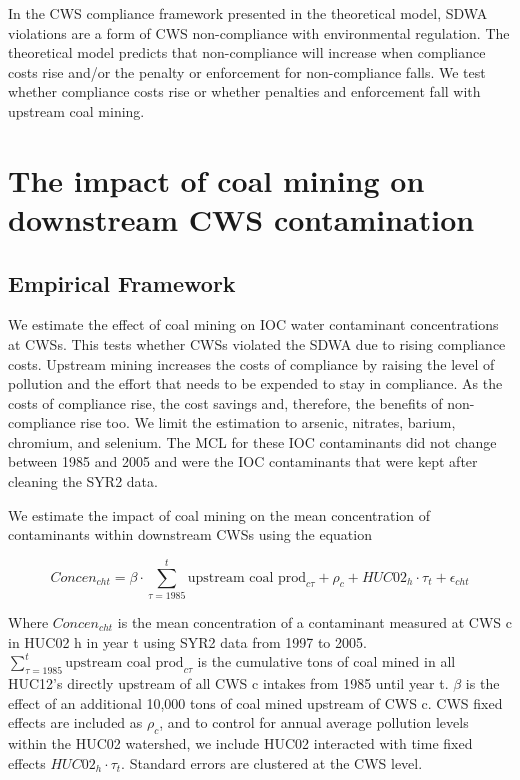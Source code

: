 \documentclass{article}
\begin{document}
In the CWS compliance framework presented in the theoretical model, SDWA violations are a form of CWS non-compliance with environmental regulation. The theoretical model predicts that non-compliance will increase when compliance costs rise and/or the penalty or enforcement for non-compliance falls. We test whether compliance costs rise or whether penalties and enforcement fall with upstream coal mining.







\section{The impact of coal mining on downstream CWS contamination}

\subsection{Empirical Framework}

We estimate the effect of coal mining on IOC water contaminant concentrations at CWSs. This tests whether CWSs violated the SDWA due to rising compliance costs. Upstream mining increases the costs of compliance by raising the level of pollution and the effort that needs to be expended to stay in compliance. As the costs of compliance rise, the cost savings and, therefore, the benefits of non-compliance rise too. We limit the estimation to arsenic, nitrates, barium, chromium, and selenium. The MCL for these IOC contaminants did not change between 1985 and 2005 and were the IOC contaminants that were kept after cleaning the SYR2 data.

We estimate the impact of coal mining on the mean concentration of contaminants within downstream CWSs using the equation

\begin{equation}\label{eq:huc02reg}
    \textit{Concen}_{cht}= \beta\cdot\sum_{\tau=1985}^t\text{upstream coal prod}_{c\tau}  + \rho_c + HUC02_h\cdot\tau_t + \epsilon_{cht}
\end{equation}

Where $\textit{Concen}_{cht}$ is the mean concentration of a contaminant measured at CWS c in HUC02 h in year t using SYR2 data from 1997 to 2005. $\sum_{\tau=1985}^t\text{upstream coal prod}_{c\tau}$ is the cumulative tons of coal mined in all HUC12's directly upstream of all CWS c intakes from 1985 until year t. $\beta$ is the effect of an additional 10,000 tons of coal mined upstream of CWS c. CWS fixed effects are included as $\rho_c$, and to control for annual average pollution levels within the HUC02 watershed, we include HUC02 interacted with time fixed effects $HUC02_h\cdot\tau_t$. Standard errors are clustered at the CWS level.
\end{document}
